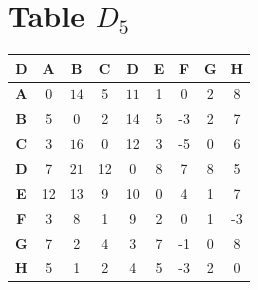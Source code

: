 \documentclass{article}
\begin{document}
\section{Table $D_{5}$}
\begin{center}
    \begin{tabular}{|c||c|c|c|c|c|c|c|c|}
        \hline
        \textbf{D} & \textbf{A} & \textbf{B} & \textbf{C} & \textbf{D} & \textbf{E} & \textbf{F} & \textbf{G} & \textbf{H} \\
        \hline
        \hline
        \textbf{A}& 0 & \cellcolor[HTML]{D74894}$14$ & 5 & \cellcolor[HTML]{D74894}$11$ & 1 & 0 & \cellcolor[HTML]{D74894}$2$ & \cellcolor[HTML]{D74894}$8$ \\
        \hline
        \textbf{B}& 5 & 0 & 2 & 14 & 5 & -3 & 2 & 7 \\
        \hline
        \textbf{C}& 3 & \cellcolor[HTML]{D74894}$16$ & 0 & 12 & 3 & -5 & 0 & 6 \\
        \hline
        \textbf{D}& 7 & \cellcolor[HTML]{D74894}$21$ & 12 & 0 & 8 & 7 & 8 & 5 \\
        \hline
        \textbf{E}& 12 & 13 & 9 & 10 & 0 & 4 & 1 & 7 \\
        \hline
        \textbf{F}& 3 & 8 & 1 & 9 & 2 & 0 & 1 & -3 \\
        \hline
        \textbf{G}& 7 & 2 & 4 & 3 & 7 & -1 & 0 & 8 \\
        \hline
        \textbf{H}& 5 & 1 & 2 & 4 & 5 & -3 & 2 & 0 \\
        \hline
    \end{tabular}
\end{center}
\end{document}
